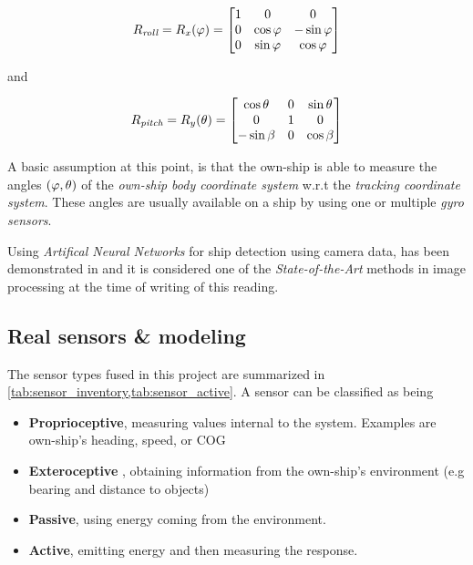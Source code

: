 \begin{description}
\begin{equation}
R_{\textit{roll}}= R_x({\varphi}) =
\begin{bmatrix}
1 &0 &0\\
0 &\cos{\varphi} &-\sin {\varphi}\\
0 &\sin {\varphi} &\cos {\varphi}
\end{bmatrix}
\end{equation}


and


\begin{equation}
R_{\textit{pitch}}= R_y({\theta}) =
\begin{bmatrix}
\cos{\theta} &0 &\sin {\theta}\\
0 &1 &0\\
-\sin \beta &0 &\cos\beta
\end{bmatrix}
\end{equation}

A basic assumption at this point, is that the own-ship is able to measure the angles $({\varphi},{\theta})$ of the \emph{own-ship body coordinate system} w.r.t the \emph{tracking coordinate system}. These angles are usually available on a ship by using one or multiple \emph{gyro sensors}.

\end{description}

 Using \emph{Artifical Neural Networks} for ship detection using camera data, has been demonstrated in \cite{Blanke2020} and it is considered one of the \emph{State-of-the-Art} methods in image processing at the time of writing of this reading.

\subsection{Real sensors \& modeling}

The sensor types fused in this project are summarized in \cref{tab:sensor_inventory,tab:sensor_active}. A sensor can be classified as being

\begin{itemize}
\item\textbf{Proprioceptive}, measuring values internal to
	the system. Examples are own-ship's heading, speed, or COG
	\item\textbf{Exteroceptive} , obtaining information from the own-ship's environment (e.g bearing and distance to objects)
	\item\textbf{Passive}, using energy coming from the
	environment. 
	\item\textbf{Active}, emitting energy and then measuring the response.
\end{itemize}
 

